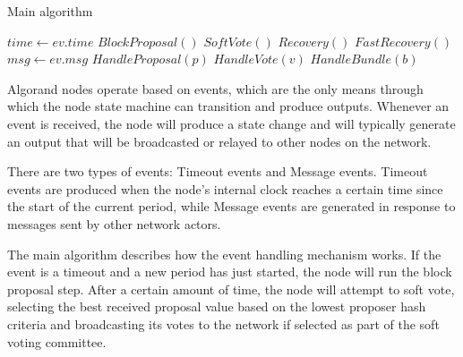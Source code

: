 \documentclass[10pt,a4paper]{article}
\begin{document}
\begin{section}{Main algorithm}


\begin{algorithm}[H]
    \begin{algorithmic}[1]
    
        \State $time \gets ev.time$
            \State $BlockProposal()$
            \State $SoftVote()$
            \State $Recovery()$
            \State $FastRecovery()$
        \EndIf
    \Else %
        \State $msg \gets ev.msg$
            \State $HandleProposal(p)$
            \State $HandleVote(v)$
            \State $HandleBundle(b)$
        \EndIf
    \EndIf

    \EndFunction
    \end{algorithmic}
    \caption{\underline{Main node algorithm}}
\end{algorithm}

Algorand nodes operate based on events, which are the only means 
through which the node state machine can transition and produce outputs. 
Whenever an event is received, the node will produce a state change and
will typically generate an output that will be broadcasted or relayed to other nodes on the network.

There are two types of events: Timeout events and Message events. Timeout events are produced when 
the node's internal clock reaches a certain time since the start of the current period, while 
Message events are generated in response to messages sent by other network actors.

The main algorithm describes how the event handling mechanism works. 
If the event is a timeout and a new period has just started, the node will run the block proposal step. 
After a certain amount of time, the node will attempt to soft vote, selecting the best received proposal 
value based on the lowest proposer hash criteria and broadcasting its votes to the network if selected as part of the soft voting committee.


\end{section}
\end{document}
